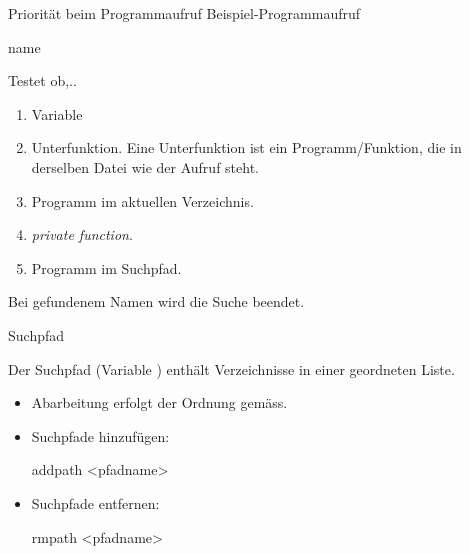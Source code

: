 \documentclass[hyperref={xetex}]{beamer}
\begin{document}
\begin{frame}[fragile]{Priorität beim Programmaufruf}
Beispiel-Programmaufruf
\begin{matlabin}
name
\end{matlabin}

Testet ob,..
\begin{enumerate}
\item  \alert{Variable}
\item  \alert{Unterfunktion}. Eine
  Unterfunktion ist ein Programm/Funktion, die in derselben Datei wie der
  Aufruf steht.
\item  Programm im \alert{aktuellen Verzeichnis}.
\item  \textit{private function}.
\item  Programm im \alert{Suchpfad}. 
\end{enumerate}
Bei gefundenem Namen wird die Suche beendet.
\end{frame}

\begin{frame}[fragile]{Suchpfad}

Der Suchpfad (Variable ) enthält Verzeichnisse in einer geordneten Liste.

\begin{itemize}
\item Abarbeitung erfolgt der Ordnung gemäss.
\item  Suchpfade hinzufügen:
\begin{matlabin}
addpath <pfadname>
\end{matlabin}
\item Suchpfade entfernen:
\begin{matlabin}
rmpath <pfadname>
\end{matlabin}
\end{itemize}
\end{frame}
\end{document}
